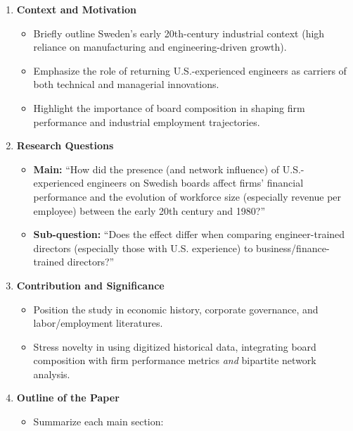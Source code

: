 \documentclass[
]{article}
\providecommand{\tightlist}{%
  \setlength{\itemsep}{0pt}\setlength{\parskip}{0pt}}\usepackage{longtable,booktabs,array}
\begin{document}
\begin{enumerate}
\def\labelenumi{\arabic{enumi}.}
\tightlist
\item
  \textbf{Context and Motivation}

  \begin{itemize}
  \tightlist
  \item
    Briefly outline Sweden's early 20th-century industrial context (high
    reliance on manufacturing and engineering-driven growth).\\
  \item
    Emphasize the role of returning U.S.-experienced engineers as
    carriers of both technical and managerial innovations.\\
  \item
    Highlight the importance of board composition in shaping firm
    performance and industrial employment trajectories.
  \end{itemize}
\item
  \textbf{Research Questions}

  \begin{itemize}
  \tightlist
  \item
    \textbf{Main:} ``How did the presence (and network influence) of
    U.S.-experienced engineers on Swedish boards affect firms' financial
    performance and the evolution of workforce size (especially revenue
    per employee) between the early 20th century and 1980?''\\
  \item
    \textbf{Sub-question:} ``Does the effect differ when comparing
    engineer-trained directors (especially those with U.S. experience)
    to business/finance-trained directors?''
  \end{itemize}
\item
  \textbf{Contribution and Significance}

  \begin{itemize}
  \tightlist
  \item
    Position the study in economic history, corporate governance, and
    labor/employment literatures.\\
  \item
    Stress novelty in using digitized historical data, integrating board
    composition with firm performance metrics \emph{and} bipartite
    network analysis.
  \end{itemize}
\item
  \textbf{Outline of the Paper}

  \begin{itemize}
  \tightlist
  \item
    Summarize each main section:


\end{itemize}
\end{enumerate}
\end{document}
